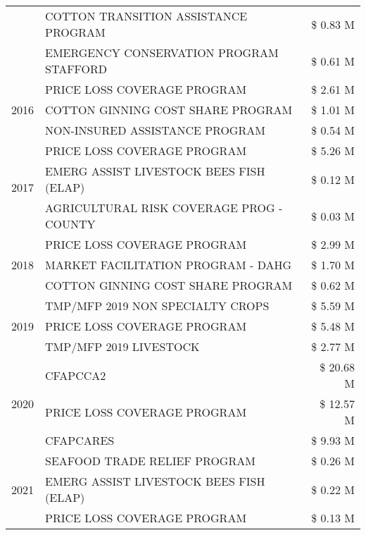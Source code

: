 \begin{tabular}{llr}
 & COTTON TRANSITION ASSISTANCE PROGRAM & \$ 0.83 M \\
 & EMERGENCY CONSERVATION PROGRAM STAFFORD & \$ 0.61 M \\
\cline{1-3}
\multirow[t]{3}{*}{2016} & PRICE LOSS COVERAGE PROGRAM                   & \$ 2.61 M \\
 & COTTON GINNING COST SHARE PROGRAM             & \$ 1.01 M \\
 & NON-INSURED ASSISTANCE PROGRAM                & \$ 0.54 M \\
\cline{1-3}
\multirow[t]{3}{*}{2017} & PRICE LOSS COVERAGE PROGRAM & \$ 5.26 M \\
 & EMERG ASSIST LIVESTOCK BEES FISH (ELAP) & \$ 0.12 M \\
 & AGRICULTURAL RISK COVERAGE PROG - COUNTY & \$ 0.03 M \\
\cline{1-3}
\multirow[t]{3}{*}{2018} & PRICE LOSS COVERAGE PROGRAM & \$ 2.99 M \\
 & MARKET FACILITATION PROGRAM - DAHG & \$ 1.70 M \\
 & COTTON GINNING COST SHARE PROGRAM & \$ 0.62 M \\
\cline{1-3}
\multirow[t]{3}{*}{2019} & TMP/MFP 2019 NON SPECIALTY CROPS & \$ 5.59 M \\
 & PRICE LOSS COVERAGE PROGRAM & \$ 5.48 M \\
 & TMP/MFP 2019 LIVESTOCK & \$ 2.77 M \\
\cline{1-3}
\multirow[t]{3}{*}{2020} & CFAPCCA2 & \$ 20.68 M \\
 & PRICE LOSS COVERAGE PROGRAM & \$ 12.57 M \\
 & CFAPCARES & \$ 9.93 M \\
\cline{1-3}
\multirow[t]{3}{*}{2021} & SEAFOOD TRADE RELIEF PROGRAM & \$ 0.26 M \\
 & EMERG ASSIST LIVESTOCK BEES FISH (ELAP) & \$ 0.22 M \\
 & PRICE LOSS COVERAGE PROGRAM & \$ 0.13 M \\
\cline{1-3}
\bottomrule
\end{tabular}
